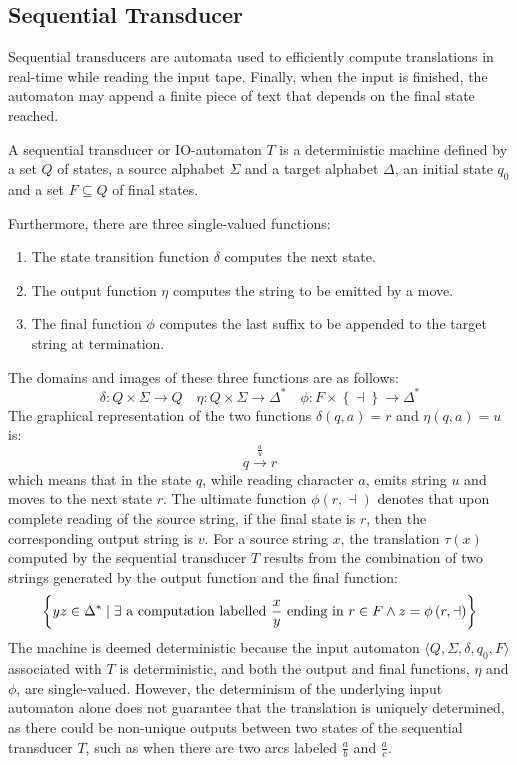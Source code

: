 \subsection{Sequential Transducer}
Sequential transducers are automata used to efficiently compute translations in real-time while reading the input tape. 
Finally, when the input is finished, the automaton may append a finite piece of text that depends on the final state reached.
\begin{definition}
    A sequential transducer or IO-automaton $T$ is a deterministic machine defined by a set $Q$ of states, a source alphabet $\Sigma$ and a target alphabet $\Delta$, an initial state $q_0$ and a set $F \subseteq Q$ of final states.
\end{definition}
Furthermore, there are three single-valued functions:
\begin{enumerate}
    \item The state transition function $\delta$ computes the next state.
    \item The output function $\eta$ computes the string to be emitted by a move.
    \item The final function $\phi$ computes the last suffix to be appended to the target string at termination.
\end{enumerate}
The domains and images of these three functions are as follows:
\[ \delta: Q \times \Sigma \rightarrow Q \quad \eta: Q \times \Sigma \rightarrow \Delta^{\ast} \quad \phi : F \times \left\{ \dashv \right\} \rightarrow \Delta^{\ast} \]
The graphical representation of the two functions $\delta(q, a) = r$ and $\eta(q, a) = u$ is:
\[ q \xrightarrow{\frac{a}{u}} r \]
which means that in the state $q$, while reading character $a$, emits string $u$ and moves to the next state $r$.
The ultimate function $\phi(r, \dashv)$ denotes that upon complete reading of the source string, if the final state is $r$, then the corresponding output string is $v$.
For a source string $x$, the translation $\tau(x)$ computed by the sequential transducer $T$ results from the combination of two strings generated by the output function and the final function:
\[ \left\{ yz \in \Delta^{\ast} \mid\exists  \textnormal{ a computation labelled } \dfrac{x}{y} \textnormal{ ending in } r \in F \land z = \phi\left( r, \dashv \right) \right\} \]
The machine is deemed deterministic because the input automaton $\langle Q, \Sigma, \delta, q_0, F \rangle$ associated with $T$ is deterministic, and both the output and final functions, $\eta$ and $\phi$, are single-valued.
However, the determinism of the underlying input automaton alone does not guarantee that the translation is uniquely determined, as there could be non-unique outputs between two states of the sequential transducer $T$, such as when there are two arcs labeled $\frac{a}{b}$ and $\frac{a}{c}$.

